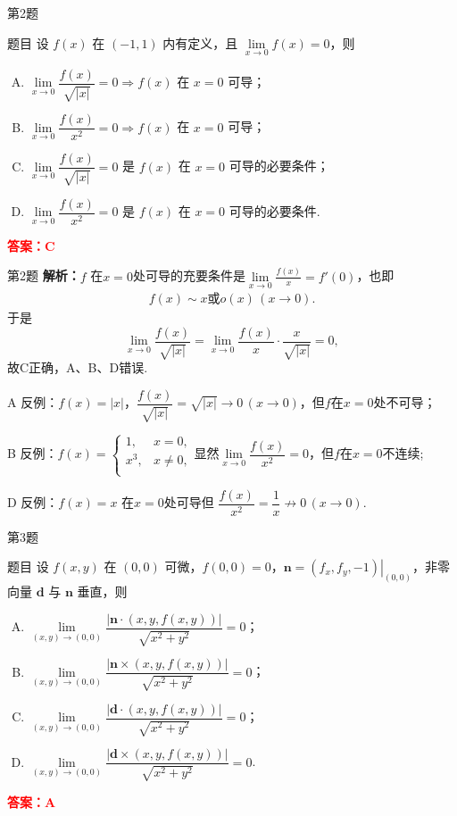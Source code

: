 \documentclass[aspectratio=169]{beamer}
\begin{document}
\begin{frame}{第2题}
\begin{block}{题目}
设 $f(x)$ 在 $(-1,1)$ 内有定义，且 $\lim\limits_{x\to 0}f(x)=0$，则
\begin{enumerate}[A.]
\item $\lim\limits_{x\to 0}\dfrac{f(x)}{\sqrt{|x|}}=0\Rightarrow f(x)$ 在 $x=0$ 可导；
\item $\lim\limits_{x\to 0}\dfrac{f(x)}{x^{2}}=0\Rightarrow f(x)$ 在 $x=0$ 可导；
\item $\lim\limits_{x\to 0}\dfrac{f(x)}{\sqrt{|x|}}=0$ 是 $f(x)$ 在 $x=0$ 可导的必要条件；
\item $\lim\limits_{x\to 0}\dfrac{f(x)}{x^{2}}=0$ 是 $f(x)$ 在 $x=0$ 可导的必要条件.
\end{enumerate}
\end{block}
\textcolor{red}{\textbf{答案：}$\mathbf{C}$}
\end{frame}

\begin{frame}{第2题}
\textbf{解析：}$f$ 在$x=0$处可导的充要条件是$\underset{x\rightarrow 0}{\lim}\frac{f(x)}{x}=f'(0)$，也即
\begin{align*}
f(x)\sim x\text{或}o(x) \,(x\to 0).
\end{align*}
于是
\[
\underset{x\rightarrow 0}{\lim}\frac{f(x)}{\sqrt{|x|}}=\underset{x\rightarrow 0}{\lim}\frac{f(x)}{x}\cdot \frac{x}{\sqrt{|x|}}=0,
\]
故C正确，A、B、D错误.

A 反例：$f(x)=|x|$，$\dfrac{f(x)}{\sqrt{|x|}}=\sqrt{|x|}\to 0\,(x\to 0)$，但$f$在$x=0$处不可导；

B 反例：$f\left( x \right) =\begin{cases}
1,&x=0,\\
x^3,&x\ne 0,\\
\end{cases}$显然$\lim\limits_{x\to 0}\dfrac{f(x)}{x^{2}}=0$，但$f$在$x=0$不连续;

D 反例：$f(x)=x$ 在$x=0$处可导但 $\dfrac{f(x)}{x^2}=\dfrac1x\not\to 0\,(x\to 0)$.
\end{frame}

\begin{frame}{第3题}
\begin{block}{题目}
设 $f(x,y)$ 在 $(0,0)$ 可微，$f(0,0)=0$，$\boldsymbol{n}=\left.\left(f_x,f_y,-1\right)\right|_{(0,0)}$，非零向量 $\boldsymbol{d}$ 与 $\boldsymbol{n}$ 垂直，则
\begin{enumerate}[A.]
\item $\lim\limits_{(x,y)\to(0,0)}\dfrac{|\boldsymbol{n}\cdot(x,y,f(x,y))|}{\sqrt{x^2+y^2}}=0$；
\item $\lim\limits_{(x,y)\to(0,0)}\dfrac{|\boldsymbol{n}\times(x,y,f(x,y))|}{\sqrt{x^2+y^2}}=0$；
\item $\lim\limits_{(x,y)\to(0,0)}\dfrac{|\boldsymbol{d}\cdot(x,y,f(x,y))|}{\sqrt{x^2+y^2}}=0$；
\item $\lim\limits_{(x,y)\to(0,0)}\dfrac{|\boldsymbol{d}\times(x,y,f(x,y))|}{\sqrt{x^2+y^2}}=0$.
\end{enumerate}
\end{block}
\textcolor{red}{\textbf{答案：}$\mathbf{A}$}
\end{frame}
\end{document}
